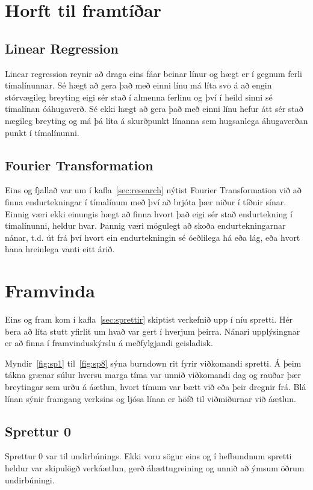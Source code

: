 \documentclass{article}
\begin{document}
\section{Horft til framtíðar}
\label{sec:future}

\subsection{Linear Regression}
\label{sec:future_linear}
Linear regression reynir að draga eins fáar beinar línur og hægt er í gegnum ferli tímalínunnar.
Sé hægt að gera það með einni línu má líta svo á að engin stórvægileg breyting 
eigi sér stað í almenna ferlinu og því í heild sinni sé tímalínan óáhugaverð. 
Sé ekki hægt að gera það með einni línu hefur átt sér stað nægileg breyting og má þá líta á skurðpunkt línanna sem
hugsanlega áhugaverðan punkt í tímalínunni.

\subsection{Fourier Transformation}
\label{sec:future_fourier}
Eins og fjallað var um í kafla~\ref{sec:research} nýtist Fourier
Transformation við að finna endurtekningar í tímalínum með því að brjóta þær
niður í tíðnir sínar.  
Einnig væri ekki einungis hægt að finna hvort það eigi sér stað endurtekning í
tímalínunni, heldur hvar. Þannig væri mögulegt að skoða endurtekningarnar nánar,
t.d. út frá því hvort ein endurtekningin sé óeðlilega há eða lág, eða hvort hana
hreinlega vanti eitt árið.

\newpage
\section{Framvinda}
Eins og fram kom í kafla~\ref{sec:sprettir} skiptist verkefnið upp í níu spretti. 
Hér bera að líta stutt yfirlit um hvað var gert í hverjum þeirra. Nánari upplýsingnar 
er að finna í framvinduskýrslu á meðfylgjandi geisladisk.

Myndir~\ref{fig:sp1} til~\ref{fig:sp8} 
sýna burndown rit fyrir viðkomandi spretti. Á þeim tákna grænar súlur hversu marga tíma var 
unnið viðkomandi dag og rauðar þær breytingar sem urðu á áætlun, hvort tímum var bætt við eða 
þeir dregnir frá. Blá línan sýnir framgang verksins og ljósa línan er höfð til viðmiðurnar 
við áætlun.

\subsection{Sprettur 0}
Sprettur 0 var til undirbúnings. Ekki voru sögur eins og í
hefbundnum spretti heldur var skipulögð verkáætlun, gerð áhættugreining og unnið að ýmsum öðrum
undirbúningi.
\newpage
\end{document}

